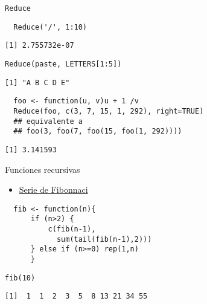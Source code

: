 \documentclass[xcolor={usenames,svgnames,dvipsnames}]{beamer}
\begin{document}
\begin{frame}[fragile,label={sec:orgheadline31}]{\texttt{Reduce}}
 \lstset{language=R,label= ,caption= ,captionpos=b,numbers=none}
\begin{lstlisting}
  Reduce('/', 1:10)
\end{lstlisting}

\begin{verbatim}
[1] 2.755732e-07
\end{verbatim}

\lstset{language=R,label= ,caption= ,captionpos=b,numbers=none}
\begin{lstlisting}
Reduce(paste, LETTERS[1:5])
\end{lstlisting}

\begin{verbatim}
[1] "A B C D E"
\end{verbatim}

\lstset{language=R,label= ,caption= ,captionpos=b,numbers=none}
\begin{lstlisting}
  foo <- function(u, v)u + 1 /v
  Reduce(foo, c(3, 7, 15, 1, 292), right=TRUE)
  ## equivalente a
  ## foo(3, foo(7, foo(15, foo(1, 292))))
\end{lstlisting}

\begin{verbatim}
[1] 3.141593
\end{verbatim}
\end{frame}

\begin{frame}[fragile,label={sec:orgheadline32}]{Funciones recursivas}
 \begin{itemize}
\item \href{http://en.wikibooks.org/wiki/R_Programming/Working_with_functions#Functions_as_Objects}{Serie de Fibonnaci}
\end{itemize}
\lstset{language=R,label= ,caption= ,captionpos=b,numbers=none}
\begin{lstlisting}
  fib <- function(n){
      if (n>2) {
          c(fib(n-1),
            sum(tail(fib(n-1),2)))
      } else if (n>=0) rep(1,n)
      }
\end{lstlisting}

\lstset{language=R,label= ,caption= ,captionpos=b,numbers=none}
\begin{lstlisting}
fib(10)
\end{lstlisting}

\begin{verbatim}
[1]  1  1  2  3  5  8 13 21 34 55
\end{verbatim}
\end{frame}
\end{document}

